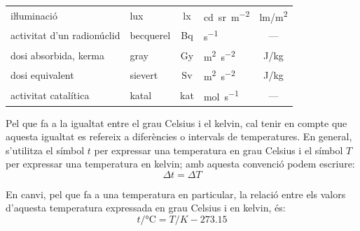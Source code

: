 \begin{ThreePartTable}
\begin{longtable}[h]{llclc}
   iŀluminació & lux & lx & \unit{cd.sr.m^{-2}} & \unit{lm/m^2} \\
   activitat  d'un radionúclid & becquerel\tnote{\color{blue}(c)} & Bq& \unit{s^{-1}} & --- \\
   dosi absorbida, kerma\tnote{\color{blue}(e)} & gray & Gy  & \unit{m^2.s^{-2}}& \unit{J/kg}\\
   dosi equivalent & sievert & Sv  & \unit{m^2.s^{-2}}& \unit{J/kg}\\
   activitat catalítica & katal & kat & \unit{mol.s^{-1}} & ---\\
   \bottomrule[1pt]
\end{longtable}
\end{ThreePartTable}
       
   
    
   
   
   
   
    
 
   
  
   
     
\index{\unit{\ohm}}    
\index{\unit{\degreeCelsius}}    

Pel que fa a la igualtat entre el grau Celsius i el kelvin, cal tenir en compte que aquesta igualtat es refereix a diferències o intervals de temperatures. En general, s'utilitza el símbol $t$ per expressar una temperatura en grau Celsius i el símbol $T$ per expressar una temperatura en kelvin; amb aquesta convenció podem escriure:
\begin{equation}
	\Delta t = \Delta T
\end{equation}

En canvi, pel que fa a una temperatura en particular, la relació entre els valors d'aquesta temperatura expressada en grau Celsius i en kelvin, és:
\begin{equation}
	t / \unit{\degreeCelsius} = T / \unit{K} - \num{273,15}
\end{equation}


